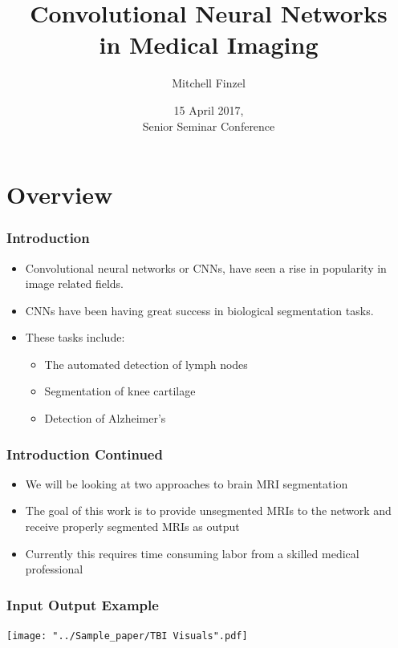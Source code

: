 \documentclass{beamer}
\title[CNNs in Medical Imaging]{Convolutional Neural Networks \\ in Medical Imaging}
\author[Finzel]{Mitchell Finzel}
\institute[U of Minn, Morris]
{
  Division of Science and Mathematics \\
  University of Minnesota, Morris \\
  Morris, Minnesota, USA
}
\date[April '17] %
{15 April 2017, \\ Senior Seminar Conference}
\begin{document}
\begin{frame}
  \titlepage
\end{frame}


\section*{Overview}

\begin{frame}
  \frametitle{Introduction}
  \tableofcontents[hideallsubsections]
  \begin{itemize}
  	\item Convolutional neural networks or CNNs, have seen a rise in popularity in image related fields.
  	\item CNNs have been having great success in biological segmentation tasks.
  	\item These tasks include:
  	\begin{itemize}
  	  \item The automated detection of lymph nodes
  	  \item Segmentation of knee cartilage
  	  \item Detection of Alzheimer's
  	\end{itemize}
  \end{itemize}
\end{frame}

\begin{frame}
  \frametitle{Introduction Continued}
  \tableofcontents[hideallsubsections]
  \begin{itemize}
	\item We will be looking at two approaches to brain MRI segmentation
	\item The goal of this work is to provide unsegmented MRIs to the network and receive properly segmented MRIs as output
	\item Currently this requires time consuming labor from a skilled medical professional
  \end{itemize}
\end{frame}

\begin{frame} 
	\frametitle{Input Output Example}
    \texttt{[image: "../Sample\_paper/TBI Visuals".pdf]}
    \\
\end{frame}
\end{document}
